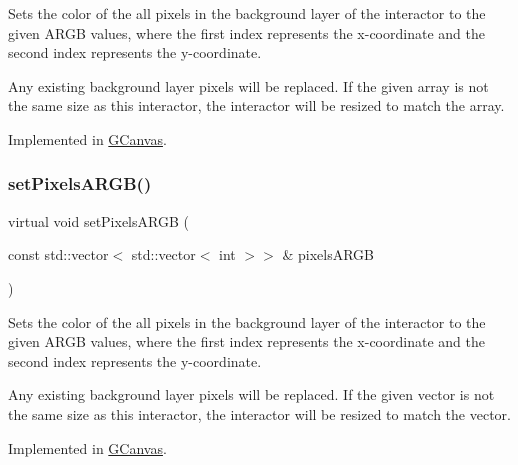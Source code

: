 Sets the color of the all pixels in the background layer of the interactor to the given A\+R\+GB values, where the first index represents the x-\/coordinate and the second index represents the y-\/coordinate. 

Any existing background layer pixels will be replaced. If the given array is not the same size as this interactor, the interactor will be resized to match the array. 

Implemented in \mbox{\hyperlink{classsgl_1_1GCanvas_a7f69ab7e71de88d5fab2be7561b9a5e1}{G\+Canvas}}.

\mbox{\label{classsgl_1_1GDrawingSurface_aca49553c1565ae50ee667bdeab5b726c}} 
\subsubsection{\texorpdfstring{set\+Pixels\+A\+R\+G\+B()}{setPixelsARGB()}\hspace{0.1cm}{\footnotesize\ttfamily [2/2]}}
{\footnotesize\ttfamily virtual void set\+Pixels\+A\+R\+GB (\begin{DoxyParamCaption}\item[{const std\+::vector$<$ std\+::vector$<$ int $>$$>$ \&}]{pixels\+A\+R\+GB }\end{DoxyParamCaption})\hspace{0.3cm}{\ttfamily [pure virtual]}}



Sets the color of the all pixels in the background layer of the interactor to the given A\+R\+GB values, where the first index represents the x-\/coordinate and the second index represents the y-\/coordinate. 

Any existing background layer pixels will be replaced. If the given vector is not the same size as this interactor, the interactor will be resized to match the vector. 

Implemented in \mbox{\hyperlink{classsgl_1_1GCanvas_a8183dc852e94c60d374eb26749c4378e}{G\+Canvas}}.

\mbox{\label{classsgl_1_1GDrawingSurface_abf5590a3992dcb7896ed449e65961da3}} 
